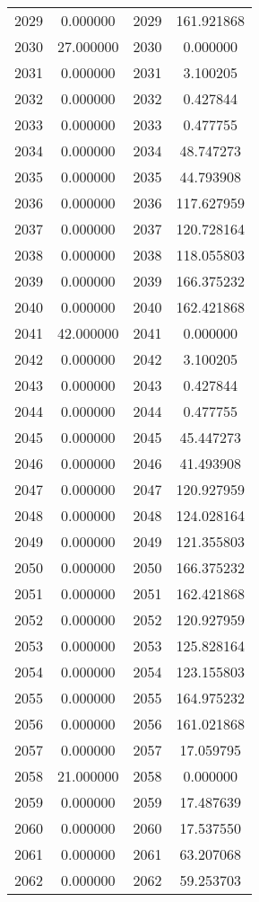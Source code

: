 \documentclass[12pt]{article}
\begin{document}
\begin{longtable}{@{}cccc@{}}
2029 & 0.000000 & 2029 & 161.921868 \\
2030 & 27.000000 & 2030 & 0.000000 \\
2031 & 0.000000 & 2031 & 3.100205 \\
2032 & 0.000000 & 2032 & 0.427844 \\
2033 & 0.000000 & 2033 & 0.477755 \\
2034 & 0.000000 & 2034 & 48.747273 \\
2035 & 0.000000 & 2035 & 44.793908 \\
2036 & 0.000000 & 2036 & 117.627959 \\
2037 & 0.000000 & 2037 & 120.728164 \\
2038 & 0.000000 & 2038 & 118.055803 \\
2039 & 0.000000 & 2039 & 166.375232 \\
2040 & 0.000000 & 2040 & 162.421868 \\
2041 & 42.000000 & 2041 & 0.000000 \\
2042 & 0.000000 & 2042 & 3.100205 \\
2043 & 0.000000 & 2043 & 0.427844 \\
2044 & 0.000000 & 2044 & 0.477755 \\
2045 & 0.000000 & 2045 & 45.447273 \\
2046 & 0.000000 & 2046 & 41.493908 \\
2047 & 0.000000 & 2047 & 120.927959 \\
2048 & 0.000000 & 2048 & 124.028164 \\
2049 & 0.000000 & 2049 & 121.355803 \\
2050 & 0.000000 & 2050 & 166.375232 \\
2051 & 0.000000 & 2051 & 162.421868 \\
2052 & 0.000000 & 2052 & 120.927959 \\
2053 & 0.000000 & 2053 & 125.828164 \\
2054 & 0.000000 & 2054 & 123.155803 \\
2055 & 0.000000 & 2055 & 164.975232 \\
2056 & 0.000000 & 2056 & 161.021868 \\
2057 & 0.000000 & 2057 & 17.059795 \\
2058 & 21.000000 & 2058 & 0.000000 \\
2059 & 0.000000 & 2059 & 17.487639 \\
2060 & 0.000000 & 2060 & 17.537550 \\
2061 & 0.000000 & 2061 & 63.207068 \\
2062 & 0.000000 & 2062 & 59.253703 \\

\end{longtable}
\end{document}
